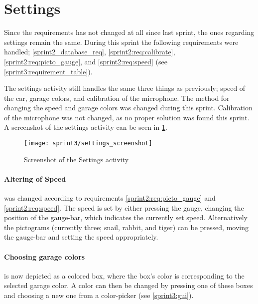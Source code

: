 \section{Settings}\label{sprint3:settings}

Since the requirements has not changed at all since last sprint, the ones regarding settings remain the same.
During this sprint the following requirements were handled; \ref{sprint2_database_req}, \ref{sprint2:req:calibrate}, \ref{sprint2:req:picto_gauge}, and \ref{sprint2:req:speed} (see \cref{sprint3:requirement_table}).

The settings activity still handles the same three things as previously; speed of the car, garage colors, and calibration of the microphone.
The method for changing the speed and garage colors was changed during this sprint.
Calibration of the microphone was not changed, as no proper solution was found this sprint.
A screenshot of the settings activity can be seen in \cref{sprint3:settings:screenshot}.

\begin{figure}
\texttt{[image: sprint3/settings\_screenshot]}
\caption{Screenshot of the Settings activity}
\label{sprint3:settings:screenshot}
\end{figure}

\paragraph{Altering of Speed} was changed according to requirements \ref{sprint2:req:picto_gauge} and \ref{sprint2:req:speed}.
The speed is set by either pressing the gauge, changing the position of the gauge-bar, which indicates the currently set speed.
Alternatively the pictograms (currently three; snail, rabbit, and tiger) can be pressed, moving the gauge-bar and setting the speed appropriately.

\paragraph{Choosing garage colors} is now depicted as a colored box, where the box's color is corresponding to the selected garage color.
A color can then be changed by pressing one of these boxes and choosing a new one from a color-picker (see \cref{sprint3:gui}).